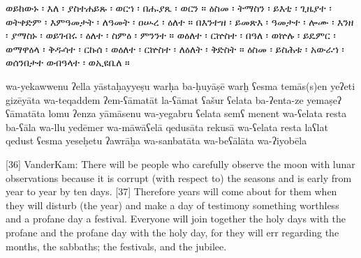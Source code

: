 \begin{ethiopictext}
    ወይከውኑ ፡ እለ ፡ ያስተሐይጹ ፡ ወርኀ ፡ በሑያጼ ፡ ወርን ።
    ዕስመ ፡ ትማስን ፡ ይእቲ ፡ ጊዜያተ ፡ ወትቀድም ፡ እምዓመታት ፡ ለዓመት ፡ ዐሡረ ፡ ዕለተ ።
    በእንተዝ ፡ ይመጽእ ፡ ዓመታተ ፡ ሎሙ ፡ እንዘ ፡ ያማስኑ ፡ ወይገብሩ ፡ ዕለተ ፡ ስምዕ ፡ ምንንተ ።
    ወዕለተ ፡ ርኵስተ ፡ በዓለ ፡ ወኵሉ ፡ ይዴምር ፡ ወማዋዕላ ፡ 
        ቅዱሳተ ፡ ርኩሰ ፡ ወዕለተ ፡ ርኵስተ ፡ ለዕለት ፡ ቅድስት ።
    ዕስመ ፡ ይስሕቱ ፡ አውራኀ ፡ ወሰንበታተ ወብዓላተ ፡ ወኢዩቤለ ።
\end{ethiopictext}
\begin{transliteration}
    wa-yekawwenu ʔella yāstaḥayyeṣu warḥa ba-ḥuyāṣē warḫ
    ʕesma temās(s)en yeʔeti gizēyāta wa-teqaddem ʔem-ʕāmatāt la-ʕāmat ʕašur ʕelata
    ba-ʔenta-ze yemaṣeʔ ʕāmatāta lomu ʔenza yāmāsenu wa-yegabru ʕelata semʕ menent
    wa-ʕelata resta ba-ʕāla wa-llu yedēmer wa-māwāʕelā 
        qedusāta rekusā wa-ʕelata resta laʕlat qedust
    ʕesma yeseḥetu ʔawrāḫa wa-sanbatāta wa-beʕālāta wa-ʔiyobēla
\end{transliteration}
\begin{translation}
    [36] VanderKam: There will be people who carefully observe the moon with lunar observations 
    because it is corrupt (with respect to) the seasons and is early from year to year by ten days. 
    [37] Therefore years will come about for them when they will disturb (the year) 
    and make a day of testimony something worthless and a profane day a festival. 
    Everyone will join together the holy days with the profane and the profane day with the holy day, 
    for they will err regarding the months, the sabbaths; the festivals, and the jubilee.
\end{translation}
